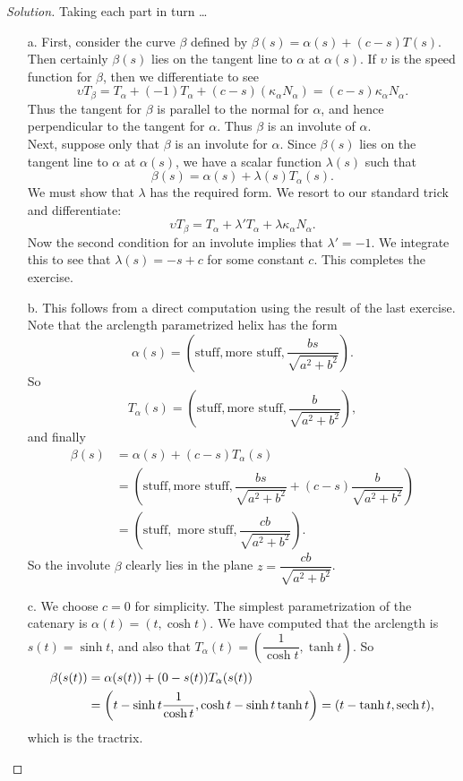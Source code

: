 \documentclass[Shifrin_Solutions_Spring_2018]{subfiles}
\begin{document}
\begin{proof}[Solution] Taking each part in turn \dots
\begin{itemize}
\item[a.] First, consider the curve $\beta$ defined by $\beta(s) = \alpha(s) + (c-s)T(s)$. 
Then certainly $\beta(s)$ lies on the tangent line to $\alpha$ at $\alpha(s)$. If $\upsilon$ 
is the speed function for $\beta$, then we differentiate to see
\[
\upsilon T_{\beta} = T_{\alpha} + (-1)T_{\alpha}  + (c-s)(\kappa_{\alpha} N_{\alpha}) 
= (c-s) \kappa_{\alpha} N_{\alpha} .
\]
Thus the tangent for $\beta$ is parallel to the normal for $\alpha$, and hence perpendicular 
to the tangent for $\alpha$. Thus $\beta$ is an involute of $\alpha$. \\

Next, suppose only that $\beta$ is an involute for $\alpha$. Since $\beta(s)$ lies on the
tangent line to $\alpha$ at $\alpha(s)$, we have a scalar function $\lambda(s)$ such that
\[
\beta(s) = \alpha(s) + \lambda(s) T_{\alpha}(s) .
\]
We must show that $\lambda$ has the required form. We resort to our standard trick and 
differentiate:
\[
\upsilon T_{\beta} = T_{\alpha} + \lambda' T_{\alpha} + \lambda\kappa_{\alpha} N_{\alpha}.
\]
Now the second condition for an involute implies that $\lambda' = -1$. We integrate this 
to see that $\lambda(s) = -s + c$ for some constant $c$. This completes the exercise.\\


\item[b.] This follows from a direct computation using the result of the last exercise. 
Note that the arclength parametrized helix has the form
\[
\alpha(s) = \left( \mbox{stuff}, \mbox{more stuff} , \dfrac{bs}{\sqrt{a^2+b^2}} \right) .
\]
So
\[
T_{\alpha}(s) = \left( \mbox{stuff}, \mbox{more stuff}, \dfrac{b}{\sqrt{a^2 + b^2}} \right),
\]
and finally
\[
\begin{split}
\beta(s) & = \alpha(s) + (c - s) T_{\alpha}(s)\\
&  = \left( \mbox{stuff}, \mbox{more stuff}, \dfrac{bs}{\sqrt{a^2+b^2}} 
  + (c-s)\dfrac{b}{\sqrt{a^2 + b^2}} \right) \\
& = \left( \mbox{stuff}, \mbox{ more stuff} , \dfrac{cb}{\sqrt{a^2+b^2}} \right) .
\end{split}
\]
So the involute $\beta$ clearly lies in the plane $z = \dfrac{cb}{\sqrt{a^2+b^2}}$.\\

\item[c.]  We choose $c=0$ for simplicity. The simplest parametrization of the catenary 
is $\alpha(t) = ( t ,\cosh t)$. We have computed that the arclength is $s(t)  = \sinh t$, 
and also that
$T_{\alpha}(t) =\left( \dfrac{1}{\cosh t} , \tanh t\right)  $.
 So
\[
\begin{split}
\beta(s(t)) & = \alpha(s(t)) + (0 -s(t) ) T_{\alpha}(s(t))\\
&  = \left(t - \sinh t\dfrac{1}{\cosh t} , \cosh t - \sinh t \tanh t \right) 
= ( t - \tanh t , \operatorname{\mathrm{sech}} t) ,
\end{split}
\]
which is the tractrix.\\


\end{itemize}
\end{proof}
\end{document}
